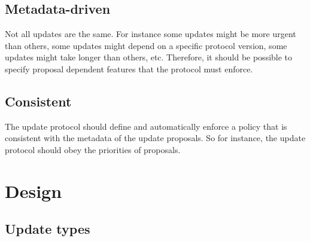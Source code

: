 \documentclass[11pt,a4paper]{article}
\begin{document}
\subsection{Metadata-driven}
\label{sec:metadata-driven}

Not all updates are the same. For instance some updates might be more urgent
than others, some updates might depend on a specific protocol version, some
updates might take longer than others, etc. Therefore, it should be possible to
specify proposal dependent features that the protocol must enforce.

\subsection{Consistent}
\label{sec:cons-update-logic}

The update protocol should define and automatically enforce a policy that is
consistent with the metadata of the update proposals. So for instance, the
update protocol should obey the priorities of proposals.

\section{Design}
\label{sec:design}




\subsection{Update types}
\label{sec:update-types}
\end{document}
